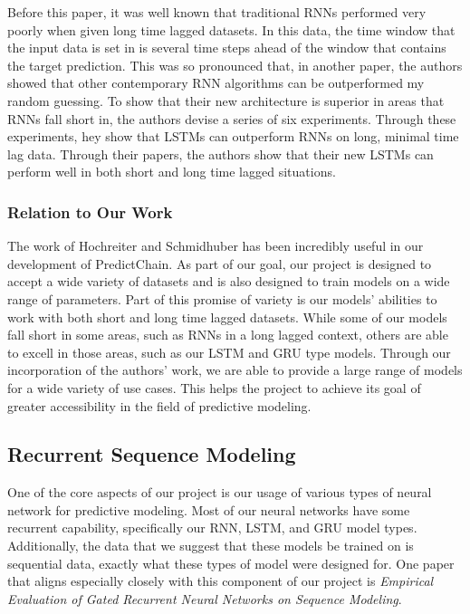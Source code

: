 \documentclass{article}
\begin{document}
    Before this paper, it was well known that traditional RNNs performed very poorly when given long time lagged
    datasets.   In this data, the time window that the input data is set in is several time steps ahead of the window
    that contains the target prediction.  This was so pronounced that, in another paper\cite{weightGuessing}, the authors
    showed that other contemporary RNN algorithms can be outperformed my random guessing.  To show that their new
    architecture is superior in areas that RNNs fall short in, the authors devise a series of six experiments.
    Through these experiments, hey show that LSTMs can outperform RNNs on long, minimal time lag data.  Through their
    papers, the authors show that their new LSTMs can perform well in both short and long time lagged situations.

    \subsubsection*{Relation to Our Work}

    The work of Hochreiter and Schmidhuber has been incredibly useful in our development of PredictChain.  As part of
    our goal, our project is designed to accept a wide variety of datasets and is also designed to train models on
    a wide range of parameters.  Part of this promise of variety is our models' abilities to work with both short
    and long time lagged datasets.  While some of our models fall short in some areas, such as RNNs in a long lagged
    context, others are able to excell in those areas, such as our LSTM and GRU type models.  Through our incorporation
    of the authors' work, we are able to provide a large range of models for a wide variety of use cases.  This helps
    the project to achieve its goal of greater accessibility in the field of predictive modeling.


    \subsection{Recurrent Sequence Modeling}

    One of the core aspects of our project is our usage of various types of neural network for predictive modeling.
    Most of our neural networks have some recurrent capability, specifically our RNN, LSTM, and GRU model types.
    Additionally, the data that we suggest that these models be trained on is sequential data, exactly what these
    types of model were designed for.  One paper that aligns especially closely with this component of our project
    is \textit{Empirical Evaluation of Gated Recurrent Neural Networks on Sequence Modeling}\cite{recurrentModeling}.
\end{document}
